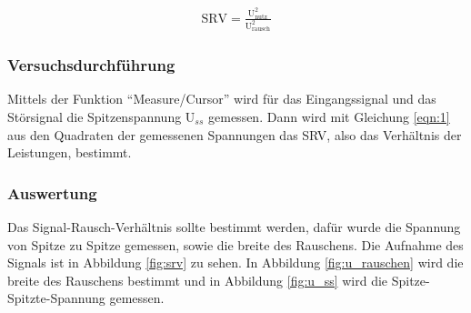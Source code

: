 \documentclass[12pt,a4paper]{article}
\begin{document}
\begin{align}
\text{SRV}=\frac{\text{U}_\text{nutz}^2}{\text{U}_\text{rausch}^2}
\label{eqn:1}
\end{align}


\subsubsection*{Versuchsdurchführung}

Mittels der Funktion "`Measure/Cursor"' wird für das Eingangssignal und das Störsignal die  Spitzenspannung U$_{ss}$ gemessen. Dann wird mit Gleichung \ref{eqn:1} aus den Quadraten der gemessenen Spannungen das SRV, also das Verhältnis der Leistungen, bestimmt.

\subsubsection*{Auswertung}

Das Signal-Rausch-Verhältnis sollte bestimmt werden, dafür wurde die Spannung von Spitze zu Spitze gemessen, sowie die breite des Rauschens. Die Aufnahme des Signals ist in Abbildung \ref{fig:srv} zu sehen. In Abbildung \ref{fig:u_rauschen} wird die breite des Rauschens bestimmt und in Abbildung \ref{fig:u_ss} wird die Spitze-Spitzte-Spannung gemessen.
\end{document}
